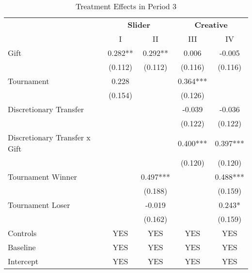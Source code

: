 
\begin{table}[h]%
\caption{Treatment Effects in Period 3}
\begin{center}%
{\small\renewcommand{\arraystretch}{0.5}%
\begin{tabular}{lcccc}
\hline\hline\noalign{\smallskip}
 &\multicolumn{2}{c}{\normalsize{\textbf{Slider}}}&\multicolumn{2}{c}{\normalsize{\textbf{Creative}}} \\
 &\multicolumn{1}{c}{I}&\multicolumn{1}{c}{II}&\multicolumn{1}{c}{III}&\multicolumn{1}{c}{IV}\\
\hline\noalign{\smallskip}
Gift      	&	       0.282**       	&	 0.292**	&	       0.006	&	   -0.005	\\
                    	&	     (0.112)   	&	     (0.112)   	&	     (0.116)   	&	     (0.116)                   \\[2mm]	
Tournament	&	       0.228	&	               	&	       0.364***	&	                               \\	
                    	&	     (0.154)   	&	               	&	     (0.126)   	&	                               \\[2mm]	
Discretionary Transfer	&	               	&	               	&	-0.039	&	-0.036             \\	
                    	&	               	&	               	&	     (0.122)   	&	     (0.122)                   \\[2mm]	
Discretionary Transfer x Gift	&	               	&	               	&	       0.400***	&	      0.397***   \\	
                    	&	               	&	               	&	     (0.120)   	&	     (0.120)                  \\[2mm]	
Tournament Winner	&	               	&	       0.497***	&	               	&	       0.488***         \\	
                    	&	               	&	     (0.188)   	&	               	&	     (0.159)                   \\[2mm]	
Tournament Loser	&	               	&	       -0.019   	&	               	&	       0.243*             \\	
                    	&	               	&	     (0.162)   	&	               	&	     (0.159)                   \\[2mm]	
\hline\noalign{\smallskip}
Controls &       YES & YES & YES & YES       \\
Baseline &          YES & YES & YES & YES    \\
Intercept &           YES & YES & YES & YES   \\

\end{tabular}}
\end{center}
\end{table}
